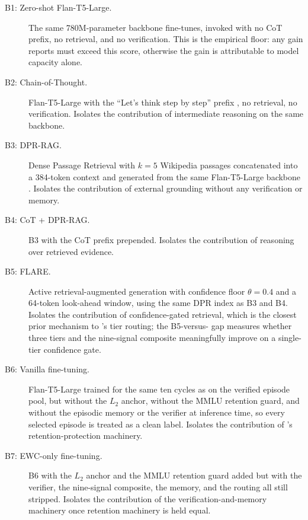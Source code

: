 \begin{description}
  \item[B1: Zero-shot Flan-T5-Large.]
  The same 780M-parameter backbone \caem{} fine-tunes, invoked with no
  CoT prefix, no retrieval, and no verification. This is the empirical
  floor: any gain \caem{} reports must exceed this score, otherwise the
  gain is attributable to model capacity alone.

  \item[B2: Chain-of-Thought.]
  Flan-T5-Large with the ``Let's think step by step'' prefix
  \cite{wei2022chain}, no retrieval, no verification. Isolates the
  contribution of intermediate reasoning on the same backbone.

  \item[B3: DPR-RAG.]
  Dense Passage Retrieval \cite{karpukhin-etal-2020-dense} with
  $k=5$ Wikipedia passages concatenated into a 384-token context and
  generated from the same Flan-T5-Large backbone
  \cite{NEURIPS2020_6b493230}. Isolates the contribution of external
  grounding without any verification or memory.

  \item[B4: CoT + DPR-RAG.]
  B3 with the CoT prefix prepended. Isolates the contribution of
  reasoning over retrieved evidence.

  \item[B5: FLARE.]
  Active retrieval-augmented generation \cite{jiang-etal-2023-active}
  with confidence floor $\theta = 0.4$ and a 64-token look-ahead
  window, using the same DPR index as B3 and B4. Isolates the
  contribution of confidence-gated retrieval, which is the closest
  prior mechanism to \caem{}'s tier routing; the B5-versus-\caem{}
  gap measures whether three tiers and the nine-signal composite
  meaningfully improve on a single-tier confidence gate.

  \item[B6: Vanilla fine-tuning.]
  Flan-T5-Large trained for the same ten cycles as \caem{} on the
  verified episode pool, but without the $L_2$ anchor, without the
  MMLU retention guard, and without the episodic memory or the
  verifier at inference time, so every selected episode is treated as
  a clean label. Isolates the contribution of \caem{}'s
  retention-protection machinery.

  \item[B7: EWC-only fine-tuning.]
  B6 with the $L_2$ anchor and the MMLU retention guard added
  \cite{doi:10.1073/pnas.1611835114} but with the verifier, the
  nine-signal composite, the memory, and the routing all still
  stripped. Isolates the contribution of the
  verification-and-memory machinery once retention machinery is held
  equal.


\end{description}
